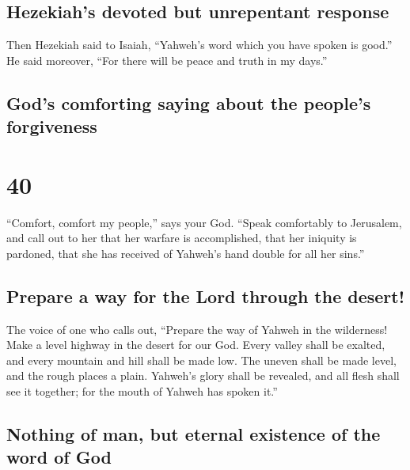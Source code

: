 \hypertarget{hezekiahs-devoted-but-unrepentant-response}{%
\subsection{Hezekiah's devoted but unrepentant
response}\label{hezekiahs-devoted-but-unrepentant-response}}

 Then Hezekiah said to Isaiah, ``Yahweh's word which you
have spoken is good.'' He said moreover, ``For there will be peace and
truth in my days.''

\hypertarget{gods-comforting-saying-about-the-peoples-forgiveness}{%
\subsection{God's comforting saying about the people's
forgiveness}\label{gods-comforting-saying-about-the-peoples-forgiveness}}

\hypertarget{section-39}{%
\section{40}\label{section-39}}

 ``Comfort, comfort my people,'' says your God.
 ``Speak comfortably to Jerusalem, and call out to her
that her warfare is accomplished, that her iniquity is pardoned, that
she has received of Yahweh's hand double for all her sins.''

\hypertarget{prepare-a-way-for-the-lord-through-the-desert}{%
\subsection{Prepare a way for the Lord through the
desert!}\label{prepare-a-way-for-the-lord-through-the-desert}}

 The voice of one who calls out, ``Prepare the way of
Yahweh in the wilderness! Make a level highway in the desert for our
God.  Every valley shall be exalted, and every mountain
and hill shall be made low. The uneven shall be made level, and the
rough places a plain.  Yahweh's glory shall be revealed,
and all flesh shall see it together; for the mouth of Yahweh has spoken
it.''

\hypertarget{nothing-of-man-but-eternal-existence-of-the-word-of-god}{%
\subsection{Nothing of man, but eternal existence of the word of
God}\label{nothing-of-man-but-eternal-existence-of-the-word-of-god}}

